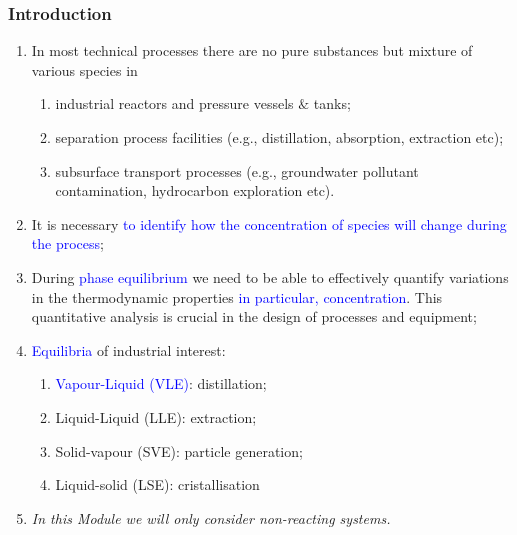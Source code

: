 \documentclass[10pt,compress]{beamer}
\begin{document}
\begin{frame}
  \frametitle{Introduction}
  \begin{enumerate}
    \item<1-> In most technical processes there are no pure substances but mixture of various species in
        \begin{enumerate}
          \item<1-> industrial reactors and pressure vessels $\&$ tanks;
          \item<1-> separation process facilities (e.g., distillation, absorption, extraction etc);
          \item<1-> subsurface transport processes (e.g., groundwater pollutant contamination, hydrocarbon exploration etc).     
        \end{enumerate}
    \item<2-> It is necessary \textcolor{blue}{to identify how the concentration of species will change during the process};
    \item<3-> During \textcolor{blue}{phase equilibrium} we need to be able to effectively quantify variations in the thermodynamic properties \textcolor{blue}{in particular, concentration}. This quantitative analysis is crucial in the design of processes and equipment;
    \item<4-> \textcolor{blue}{Equilibria} of industrial interest:
        \begin{enumerate}
          \item<5-> \textcolor{blue}{Vapour-Liquid (VLE)}: distillation;
          \item<5-> Liquid-Liquid (LLE): extraction;
          \item<5-> Solid-vapour (SVE): particle generation;
          \item<5-> Liquid-solid (LSE): cristallisation
        \end{enumerate}
    \item<5-> {\it In this Module we will only consider non-reacting systems.}
  \end{enumerate}
\end{frame}
\normalsize
\end{document}
